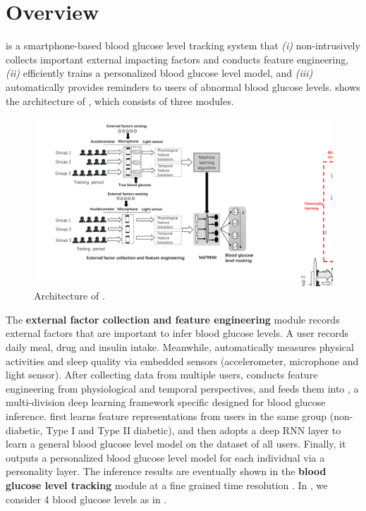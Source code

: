 
\section{Overview}
\label{sec:overview}
\sysname is a smartphone-based blood glucose level tracking system that \emph{(i)} non-intrusively collects important external impacting factors and conducts feature engineering, \emph{(ii)} efficiently trains a personalized blood glucose level model, and \emph{(iii)} automatically provides reminders to users of abnormal blood glucose levels.
 shows the architecture of \sysname, which consists of three modules.

\begin{figure}[h]
  \centering
  \includegraphics[width=0.8\columnwidth]{./img/System_Arch2.pdf}
  \caption{Architecture of \sysname.}
  \label{fig:architecture}
\end{figure}

The \textbf{external factor collection and feature engineering} module records external factors that are important to infer blood glucose levels.
A user records daily meal, drug and insulin intake.
Meanwhile, \sysname automatically measures physical activities and sleep quality via embedded sensors (\ie accelerometer, microphone and light sensor).
After collecting data from multiple users, \sysname conducts feature engineering from physiological and temporal perspectives, and feeds them into \textbf{\modelname}, a multi-division deep learning framework specific designed for blood glucose inference.
\modelname first learns feature representations from users in the same group (non-diabetic, Type I and Type II diabetic), and then adopts a deep RNN layer to learn a general blood glucose level model on the dataset of all users.
Finally, it outputs a personalized blood glucose level model for each individual via a personality layer.
The inference results are eventually shown in the \textbf{blood glucose level tracking} module at a fine grained time resolution .
In \sysname, we consider 4 blood glucose levels as in .

